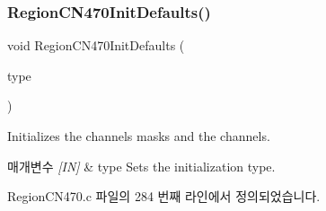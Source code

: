 \subsubsection{\texorpdfstring{Region\+C\+N470\+Init\+Defaults()}{RegionCN470InitDefaults()}}
{\footnotesize\ttfamily void Region\+C\+N470\+Init\+Defaults (\begin{DoxyParamCaption}\item[{\mbox{\hyperlink{group___r_e_g_i_o_n_gaddc73ae10673ec925724e7870363bda9}{Init\+Type\+\_\+t}}}]{type }\end{DoxyParamCaption})}



Initializes the channels masks and the channels. 


\begin{DoxyParams}{매개변수}
{\em \mbox{[}\+I\+N\mbox{]}} & type Sets the initialization type. \\
\hline
\end{DoxyParams}


Region\+C\+N470.\+c 파일의 284 번째 라인에서 정의되었습니다.


